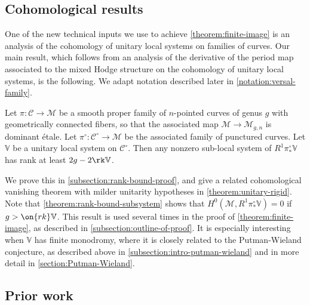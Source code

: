 \subsection{Cohomological results}
\label{subsection:cohomological}
One of the new technical inputs we use to achieve \autoref{theorem:finite-image} is
an analysis of the cohomology of unitary local systems on families of curves.
Our main result, which follows from an analysis of the derivative of the period
map associated to the mixed Hodge structure on the cohomology of unitary local
systems, is the following.
We adapt notation described later in \autoref{notation:versal-family}.
\begin{theorem}
\notready\label{theorem:rank-bound-subsystem}
Let $\pi:\mathscr{C}\to \mathscr{M}$ be a smooth proper family of $n$-pointed
curves of genus $g$ with geometrically connected fibers, so that the associated
map $\mathscr{M}\to \mathscr{M}_{g,n}$ is dominant \'etale. Let $\pi^\circ:
\mathscr{C}^\circ\to \mathscr{M}$ be the associated family of punctured curves.
Let $\mathbb{V}$ be a unitary local system on $\mathscr{C}^\circ$. Then any
nonzero sub-local system of $R^1\pi_*^\circ \mathbb{V}$ has rank at least $2g-2\rk\mathbb{V}$.
\end{theorem}
We prove this in \autoref{subsection:rank-bound-proof}, and give a related cohomological vanishing theorem with milder unitarity hypotheses in \autoref{theorem:unitary-rigid}.
Note that \autoref{theorem:rank-bound-subsystem} shows that $H^0(\mathscr{M}, R^1\pi_*^\circ \mathbb{V})=0$ if
$g>\on{rk}\mathbb{V}$.
This result is used several times in the proof of
\autoref{theorem:finite-image}, as described in
\autoref{subsection:outline-of-proof}.
It is especially interesting when $\mathbb{V}$ has finite monodromy, where it is closely related to the Putman-Wieland conjecture, as described
above in \autoref{subsection:intro-putman-wieland} and in more detail in \autoref{section:Putman-Wieland}.


\subsection{Prior work}
\label{subsection:prior-work}
